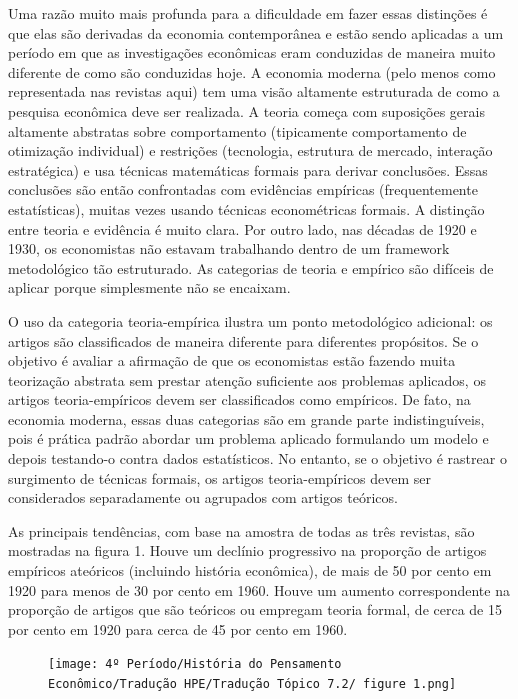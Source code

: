 \documentclass[12pt]{article}
\begin{document}
Uma razão muito mais profunda para a dificuldade em fazer essas distinções é que elas são derivadas da economia contemporânea e estão sendo aplicadas a um período em que as investigações econômicas eram conduzidas de maneira muito diferente de como são conduzidas hoje. A economia moderna (pelo menos como representada nas revistas aqui) tem uma visão altamente estruturada de como a pesquisa econômica deve ser realizada. A teoria começa com suposições gerais altamente abstratas sobre comportamento (tipicamente comportamento de otimização individual) e restrições (tecnologia, estrutura de mercado, interação estratégica) e usa técnicas matemáticas formais para derivar conclusões. Essas conclusões são então confrontadas com evidências empíricas (frequentemente estatísticas), muitas vezes usando técnicas econométricas formais. A distinção entre teoria e evidência é muito clara. Por outro lado, nas décadas de 1920 e 1930, os economistas não estavam trabalhando dentro de um framework metodológico tão estruturado. As categorias de teoria e empírico são difíceis de aplicar porque simplesmente não se encaixam.

O uso da categoria teoria-empírica ilustra um ponto metodológico adicional: os artigos são classificados de maneira diferente para diferentes propósitos. Se o objetivo é avaliar a afirmação de que os economistas estão fazendo muita teorização abstrata sem prestar atenção suficiente aos problemas aplicados, os artigos teoria-empíricos devem ser classificados como empíricos. De fato, na economia moderna, essas duas categorias são em grande parte indistinguíveis, pois é prática padrão abordar um problema aplicado formulando um modelo e depois testando-o contra dados estatísticos. No entanto, se o objetivo é rastrear o surgimento de técnicas formais, os artigos teoria-empíricos devem ser considerados separadamente ou agrupados com artigos teóricos.

As principais tendências, com base na amostra de todas as três revistas, são mostradas na figura 1. Houve um declínio progressivo na proporção de artigos empíricos ateóricos (incluindo história econômica), de mais de 50 por cento em 1920 para menos de 30 por cento em 1960. Houve um aumento correspondente na proporção de artigos que são teóricos ou empregam teoria formal, de cerca de 15 por cento em 1920 para cerca de 45 por cento em 1960. 
 \begin{figure}[H]
    \centering
    \texttt{[image: 4º Período/História do Pensamento Econômico/Tradução HPE/Tradução Tópico 7.2/ figure 1.png]}
    \end{figure}
\end{document}
